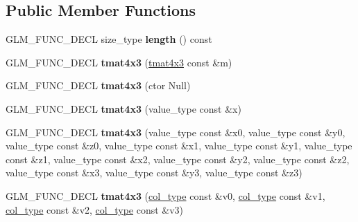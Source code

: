 \subsection*{\-Public \-Member \-Functions}
\begin{DoxyCompactItemize}
\item 
\hypertarget{structglm_1_1detail_1_1tmat4x3_a5eab0a736cb0eba07a7494bd64c01392}{\-G\-L\-M\-\_\-\-F\-U\-N\-C\-\_\-\-D\-E\-C\-L size\-\_\-type {\bfseries length} () const }\label{structglm_1_1detail_1_1tmat4x3_a5eab0a736cb0eba07a7494bd64c01392}

\item 
\hypertarget{structglm_1_1detail_1_1tmat4x3_a2bc29b38393bf401dd8f0bba108e57b6}{\-G\-L\-M\-\_\-\-F\-U\-N\-C\-\_\-\-D\-E\-C\-L {\bfseries tmat4x3} (\hyperlink{structglm_1_1detail_1_1tmat4x3}{tmat4x3} const \&m)}\label{structglm_1_1detail_1_1tmat4x3_a2bc29b38393bf401dd8f0bba108e57b6}

\item 
\hypertarget{structglm_1_1detail_1_1tmat4x3_a6b5a22077997944d553a2e29bb8bd93f}{\-G\-L\-M\-\_\-\-F\-U\-N\-C\-\_\-\-D\-E\-C\-L {\bfseries tmat4x3} (ctor \-Null)}\label{structglm_1_1detail_1_1tmat4x3_a6b5a22077997944d553a2e29bb8bd93f}

\item 
\hypertarget{structglm_1_1detail_1_1tmat4x3_a84ebf60e36ccc8664fbd5d3657ec657b}{\-G\-L\-M\-\_\-\-F\-U\-N\-C\-\_\-\-D\-E\-C\-L {\bfseries tmat4x3} (value\-\_\-type const \&x)}\label{structglm_1_1detail_1_1tmat4x3_a84ebf60e36ccc8664fbd5d3657ec657b}

\item 
\hypertarget{structglm_1_1detail_1_1tmat4x3_a2d3dad3e9daec3807c32453770702127}{\-G\-L\-M\-\_\-\-F\-U\-N\-C\-\_\-\-D\-E\-C\-L {\bfseries tmat4x3} (value\-\_\-type const \&x0, value\-\_\-type const \&y0, value\-\_\-type const \&z0, value\-\_\-type const \&x1, value\-\_\-type const \&y1, value\-\_\-type const \&z1, value\-\_\-type const \&x2, value\-\_\-type const \&y2, value\-\_\-type const \&z2, value\-\_\-type const \&x3, value\-\_\-type const \&y3, value\-\_\-type const \&z3)}\label{structglm_1_1detail_1_1tmat4x3_a2d3dad3e9daec3807c32453770702127}

\item 
\hypertarget{structglm_1_1detail_1_1tmat4x3_a594cd3ad59e0166887b7db9c6e1e2cd6}{\-G\-L\-M\-\_\-\-F\-U\-N\-C\-\_\-\-D\-E\-C\-L {\bfseries tmat4x3} (\hyperlink{structglm_1_1detail_1_1tvec3}{col\-\_\-type} const \&v0, \hyperlink{structglm_1_1detail_1_1tvec3}{col\-\_\-type} const \&v1, \hyperlink{structglm_1_1detail_1_1tvec3}{col\-\_\-type} const \&v2, \hyperlink{structglm_1_1detail_1_1tvec3}{col\-\_\-type} const \&v3)}\label{structglm_1_1detail_1_1tmat4x3_a594cd3ad59e0166887b7db9c6e1e2cd6}


\end{DoxyCompactItemize}

